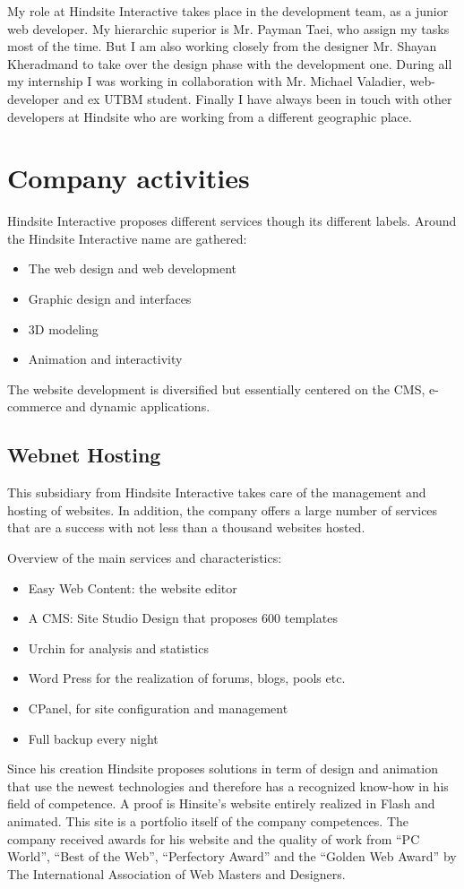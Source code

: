 My role at Hindsite Interactive takes place in the development team, as a
junior web developer. My hierarchic superior is Mr. Payman Taei, who assign
my tasks most of the time. But I am also working closely from the designer Mr.
Shayan Kheradmand to take over the design phase with the development one.
During all my internship I was working in collaboration with Mr. Michael
Valadier, web-developer and ex UTBM student.
Finally I have always been in touch with other developers at Hindsite who are
working from a different geographic place.

\section{Company activities}

Hindsite Interactive proposes different services though its different labels.
Around the Hindsite Interactive name are gathered:
\begin{itemize}
\item The web design and web development
\item Graphic design and interfaces
\item 3D modeling
\item Animation and interactivity
\end{itemize}
The website development is diversified but essentially centered on the CMS,
e-commerce and dynamic applications.

\subsection*{Webnet Hosting}

This subsidiary from Hindsite Interactive takes care of the management and
hosting of websites. In addition, the company offers a large number of
services that are a success with not less than a thousand websites hosted.

Overview of the main services and characteristics:
\begin{itemize}
\item Easy Web Content: the website editor
\item A CMS: Site Studio Design that proposes 600 templates
\item Urchin for analysis and statistics
\item Word Press for the realization of forums, blogs, pools etc.
\item CPanel, for site configuration and management
\item Full backup every night
\end{itemize}
Since his creation Hindsite proposes solutions in term of design and animation
that use the newest technologies and therefore has a recognized know-how in
his field of competence.
A proof is Hinsite’s website entirely realized in Flash and animated. This site is
a portfolio itself of the company competences.
The company received awards for his website and the quality of work from
“PC World”, “Best of the Web”, “Perfectory Award” and the “Golden Web
Award” by The International Association of Web Masters and Designers.

